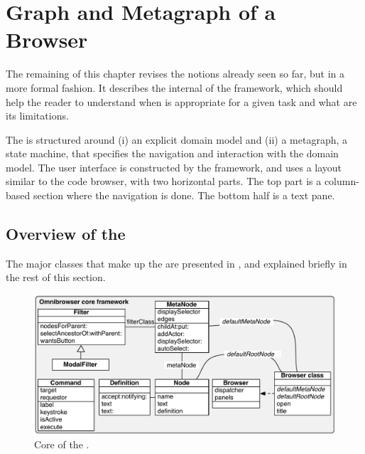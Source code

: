 \documentclass[a4paper,10pt,twoside]{book}
\begin{document}
\section{Graph and Metagraph of a Browser} \label{sec:omnibrowser}

The remaining of this chapter revises the notions already seen so far, but in a more formal fashion. It describes the internal of the framework, which should help the reader to understand when \ob is appropriate for a given task and what are its limitations.

The \obf is structured around (i) an explicit domain model and (ii) a metagraph, a state machine, that specifies the navigation and interaction with the domain model. The user interface is constructed by the framework, and uses a layout similar to the code browser, with two horizontal parts. The top part is a column-based section where the navigation is done. The bottom half is a text pane.


\subsection{Overview of the \obf}\label{sec:overview}
The major classes that make up the \obf are presented in , and explained briefly in the rest of this section. %

\begin{figure}[!ht]
\begin{center}
\includegraphics[scale=0.59]{CoreOnly}
\caption{Core of the \obf. } 
\end{center}
\end{figure}
\end{document}
